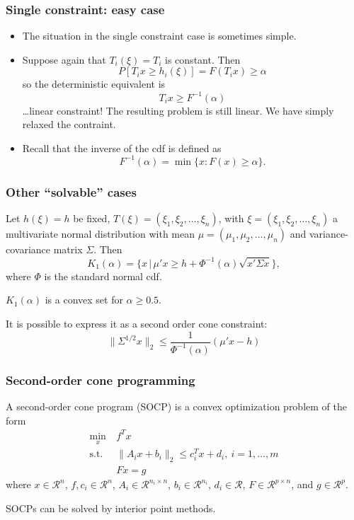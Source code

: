 \documentclass{beamer}
\def\cR{\mathcal{R}}
\begin{document}
\begin{frame}
\frametitle{Single constraint: easy case}

\begin{itemize}
	\item 
The situation in the single constraint case is sometimes simple.
\item 
Suppose again that $T_i (\xi) = T_i$ is constant. Then
\[
P[T_i x \geq h_i (\xi)] = F(T_i x) \geq \alpha
\]
so the deterministic equivalent is
\[
T_i x \geq F^{-1}(\alpha)
\]
\ldots linear constraint! The resulting problem is still linear. We have simply relaxed the contraint.
\item 
Recall that the inverse of the cdf is defined as
\[
F^{-1}(\alpha) = \min \lbrace x : F (x)  \geq \alpha \rbrace.
\]
\end{itemize}

\end{frame}

\begin{frame}
\frametitle{Other ``solvable'' cases}

Let $h(\xi) = h$ be fixed, $T(\xi) = (\xi_1, \xi_2,\ldots, \xi_n)$, with $\xi = (\xi_1, \xi_2,\ldots, \xi_n)$ a multivariate normal distribution with mean $\mu = (\mu_1, \mu_2,\ldots,\mu_n)$ and variance-covariance matrix $\Sigma$.
Then
\[
K_1(\alpha) = \lbrace x \,|\, \mu' x \geq h + \Phi^{-1}(\alpha) \sqrt{ x' \Sigma x } \rbrace,
\]
where $\Phi$ is the standard normal cdf.

\mbox{}

$K_1(\alpha)$ is a convex set for $\alpha \geq 0.5$.

\mbox{}

It is possible to express it as a second order cone constraint:
$$
\| \Sigma^{1/2} x \|_2 \leq \frac{1}{\Phi^{-1}(\alpha)} (\mu' x - h)
$$

\end{frame}

\begin{frame}
\frametitle{Second-order cone programming}

A second-order cone program (SOCP) is a convex optimization problem of the form
\begin{align*}
\min_x \ & f^T x \\
\mbox{s.t. } &
\| A_i x + b_i \|_2 \leq c_i^T x + d_i,\ i = 1,\ldots,m \\
& F x = g
\end{align*}
where $x \in \cR^n$, $f, c_i \in \cR^n$, $A_i \in \cR^{n_i \times n}$, $b_i \in \cR^{n_i}$, $d_i \in \cR$, $F \in \cR^{p \times n}$, and $g \in \cR^p$.

\mbox{}

SOCPs can be solved by interior point methods.

\end{frame}
\end{document}
